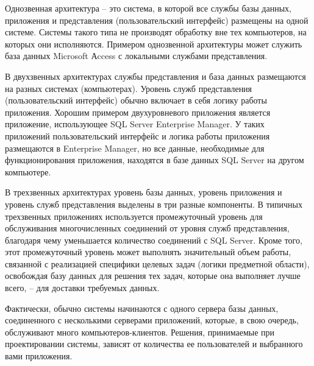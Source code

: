 Однозвенная архитектура – это система, в которой все службы базы данных, приложения и представления (пользовательский интерфейс) размещены на одной системе. Системы такого типа не производят обработку вне тех компьютеров, на которых они исполняются. Примером однозвенной архитектуры может служить база данных Microsoft Аccess с локальными службами представления.

\bigskip
В двухзвенных архитектурах службы представления и база данных размещаются на разных системах (компьютерах). Уровень служб представления (пользовательский интерфейс) обычно включает в себя логику работы приложения. Хорошим примером двухуровневого приложения является приложение, использующее SQL Server Enterprise Manager. У таких приложений пользовательский интерфейс и логика работы приложения размещаются в Enterprise Manager, но все данные, необходимые для функционирования приложения, находятся в базе данных SQL Server на другом компьютере.

\bigskip
В трехзвенных архитектурах уровень базы данных, уровень приложения и уровень служб представления выделены в три разные компоненты. В типичных трехзвенных приложениях используется промежуточный уровень для обслуживания многочисленных соединений от уровня служб представления, благодаря чему уменьшается количество соединений с SQL Server. Кроме того, этот промежуточный уровень может выполнять значительный объем работы, связанной с реализацией специфики целевых задач (логики предметной области), освобождая базу данных для решения тех задач, которые она выполняет лучше всего, – для доставки требуемых данных.

\bigskip
Фактически, обычно системы начинаются с одного сервера базы данных, соединенного с несколькими серверами приложений, которые, в свою очередь, обслуживают много компьютеров-клиентов. Решения, принимаемые при проектировании системы, зависят от количества ее пользователей и выбранного вами приложения.
